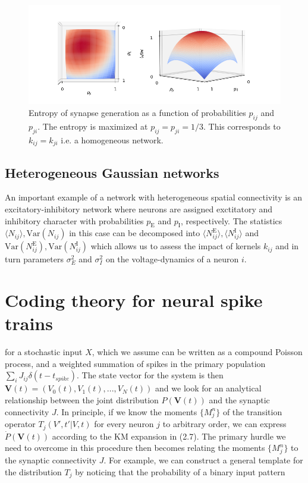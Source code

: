 \documentclass{ucetd}
\begin{document}
\begin{figure}
\centering
\includegraphics[width=150mm]{fig_7}
\caption{Entropy of synapse generation as a function of probabilities $p_{ij}$ and $p_{ji}$. The entropy is maximized at $p_{ij}=p_{ji} = 1/3$. This corresponds to $k_{ij}=k_{ji}$ i.e. a homogeneous network.}
\end{figure}




\subsection{Heterogeneous Gaussian networks}

An important example of a network with heterogeneous spatial connectivity is an excitatory-inhibitory network where neurons are assigned exctitatory and inhibitory character with probabilities $p_{\mathrm{E}}$ and $p_{\mathrm{I}}$, respectively. The statistics $\langle N_{ij}\rangle, \mathrm{Var}(N_{ij})$ in this case can be decomposed into $\langle N_{ij}^{\mathrm{E}}\rangle, \langle N_{ij}^{\mathrm{I}}\rangle$ and $\mathrm{Var}(N_{ij}^{\mathrm{E}}), \mathrm{Var}(N_{ij}^{\mathrm{I}})$ which allows us to assess the impact of kernels $k_{ij}$ and in turn parameters $\sigma_{E}^{2}$ and $\sigma_{I}^{2}$ on the voltage-dynamics of a neuron $i$.


\section{Coding theory for neural spike trains}


for a stochastic input $X$, which we assume can be written as a compound Poisson process, and a weighted summation of spikes in the primary population $\sum_{i}J_{ij}\delta(t-t_{spike})$. The state vector for the system is then $\mathbf{V}(t) = (V_{0}(t), V_{1}(t), ..., V_{N}(t))$ and we look for an analytical relationship between the joint distribution $P(\mathbf{V}(t))$ and the synaptic connectivity $J$. In principle, if we know the moments $\{M_{j}^{n}\}$  of the transition operator $T_{j}(V',t'|V,t)$ for every neuron $j$ to arbitrary order, we can express $\dot{P}(\mathbf{V}(t))$ according to the KM expansion in (2.7). The primary hurdle we need to overcome in this procedure then becomes relating the moments $\{M_{j}^{n}\}$ to the synaptic connectivity $J$. For example, we can construct a general template for the distribution $T_{j}$ by noticing that the probability of a binary input pattern
\end{document}

